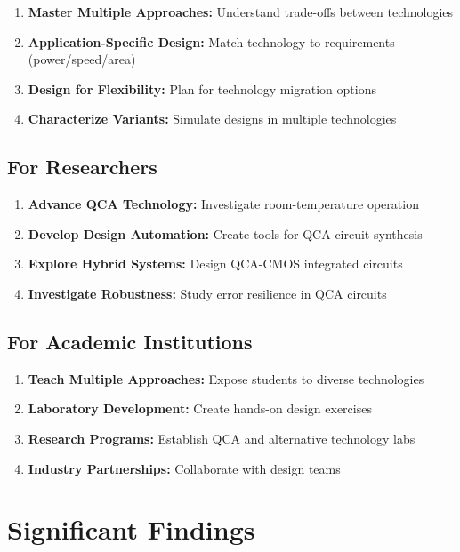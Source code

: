 \documentclass[12pt,a4paper,twoside]{report}
\begin{document}
\begin{enumerate}
    \item \textbf{Master Multiple Approaches:} Understand trade-offs between technologies
    \item \textbf{Application-Specific Design:} Match technology to requirements (power/speed/area)
    \item \textbf{Design for Flexibility:} Plan for technology migration options
    \item \textbf{Characterize Variants:} Simulate designs in multiple technologies
\end{enumerate}

\subsection{For Researchers}

\begin{enumerate}
    \item \textbf{Advance QCA Technology:} Investigate room-temperature operation
    \item \textbf{Develop Design Automation:} Create tools for QCA circuit synthesis
    \item \textbf{Explore Hybrid Systems:} Design QCA-CMOS integrated circuits
    \item \textbf{Investigate Robustness:} Study error resilience in QCA circuits
\end{enumerate}

\subsection{For Academic Institutions}

\begin{enumerate}
    \item \textbf{Teach Multiple Approaches:} Expose students to diverse technologies
    \item \textbf{Laboratory Development:} Create hands-on design exercises
    \item \textbf{Research Programs:} Establish QCA and alternative technology labs
    \item \textbf{Industry Partnerships:} Collaborate with design teams
\end{enumerate}

\section{Significant Findings}
\end{document}
